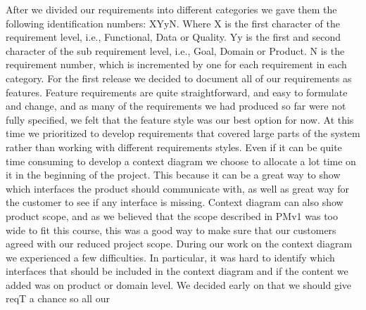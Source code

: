 \documentclass[10pt]{article}
\begin{document}
After we divided our requirements into different categories we gave them the following identification numbers: XYyN. Where X is the first character of the requirement level, i.e., Functional, Data or Quality. Yy is the first and second character of the sub requirement level, i.e., Goal, Domain or Product. N is the requirement number, which is incremented by one for each requirement in each category. 
\newline
\indent For the first release we decided to document all of our requirements as features. Feature requirements are quite straightforward, and easy to formulate and change, and as many of the requirements we had produced so far were not fully specified, we felt that the feature style was our best option for now. At this time we prioritized to develop requirements that covered large parts of the system rather than working with different requirements styles.
\newline
\indent Even if it can be quite time consuming to develop a context diagram we choose to allocate a lot time on it in the beginning of the project. This because it can be a great way to show which interfaces the product should communicate with, as well as great way for the customer to see if any interface is missing. Context diagram can also show product scope, and as we believed that the scope described in PMv1 \cite{pmv1} was too wide to fit this course, this was a good way to make sure that our customers agreed with our reduced project scope. During our work on the context diagram we experienced a few difficulties. In particular, it was hard to identify which interfaces that should be included in the context diagram and if the content we added was on product or domain level. 
\newline
\indent We decided early on that we should give reqT a chance so all our 
\end{document}
